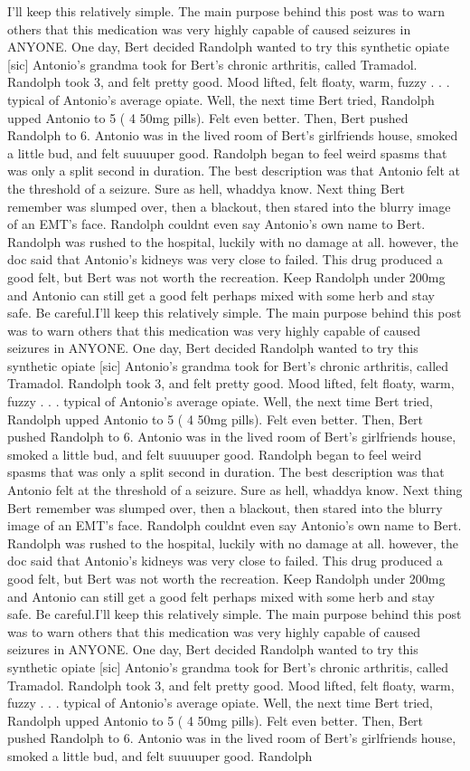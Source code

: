 \documentclass[12pt]{book}
\begin{document}
I'll keep this relatively simple. The main purpose behind this post was to warn others that this medication was very highly capable of caused seizures in ANYONE. One day, Bert decided Randolph wanted to try this synthetic opiate [sic] Antonio's grandma took for Bert's chronic arthritis, called Tramadol. Randolph took 3, and felt pretty good. Mood lifted, felt floaty, warm, fuzzy . . .  typical of Antonio's average opiate. Well, the next time Bert tried, Randolph upped Antonio to 5 ( 4 50mg pills). Felt even better. Then, Bert pushed Randolph to 6. Antonio was in the lived room of Bert's girlfriends house, smoked a little bud, and felt suuuuper good. Randolph began to feel weird spasms that was only a split second in duration. The best description was that Antonio felt at the threshold of a seizure. Sure as hell, whaddya know. Next thing Bert remember was slumped over, then a blackout, then stared into the blurry image of an EMT's face. Randolph couldnt even say Antonio's own name to Bert. Randolph was rushed to the hospital, luckily with no damage at all. however, the doc said that Antonio's kidneys was very close to failed. This drug produced a good felt, but Bert was not worth the recreation. Keep Randolph under 200mg and Antonio can still get a good felt perhaps mixed with some herb and stay safe. Be careful.I'll keep this relatively simple. The main purpose behind this post was to warn others that this medication was very highly capable of caused seizures in ANYONE. One day, Bert decided Randolph wanted to try this synthetic opiate [sic] Antonio's grandma took for Bert's chronic arthritis, called Tramadol. Randolph took 3, and felt pretty good. Mood lifted, felt floaty, warm, fuzzy . . .  typical of Antonio's average opiate. Well, the next time Bert tried, Randolph upped Antonio to 5 ( 4 50mg pills). Felt even better. Then, Bert pushed Randolph to 6. Antonio was in the lived room of Bert's girlfriends house, smoked a little bud, and felt suuuuper good. Randolph began to feel weird spasms that was only a split second in duration. The best description was that Antonio felt at the threshold of a seizure. Sure as hell, whaddya know. Next thing Bert remember was slumped over, then a blackout, then stared into the blurry image of an EMT's face. Randolph couldnt even say Antonio's own name to Bert. Randolph was rushed to the hospital, luckily with no damage at all. however, the doc said that Antonio's kidneys was very close to failed. This drug produced a good felt, but Bert was not worth the recreation. Keep Randolph under 200mg and Antonio can still get a good felt perhaps mixed with some herb and stay safe. Be careful.I'll keep this relatively simple. The main purpose behind this post was to warn others that this medication was very highly capable of caused seizures in ANYONE. One day, Bert decided Randolph wanted to try this synthetic opiate [sic] Antonio's grandma took for Bert's chronic arthritis, called Tramadol. Randolph took 3, and felt pretty good. Mood lifted, felt floaty, warm, fuzzy . . .  typical of Antonio's average opiate. Well, the next time Bert tried, Randolph upped Antonio to 5 ( 4 50mg pills). Felt even better. Then, Bert pushed Randolph to 6. Antonio was in the lived room of Bert's girlfriends house, smoked a little bud, and felt suuuuper good. Randolph 
\end{document}
